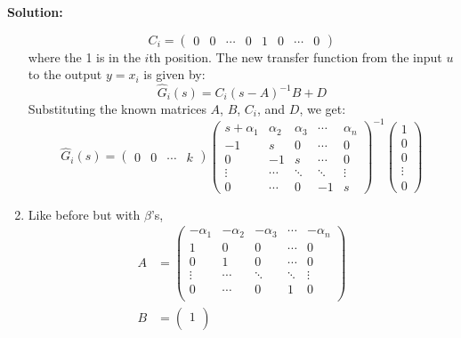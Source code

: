 \documentclass[12pt]{article}
\newenvironment{solution}{
    \textbf{Solution:}
    
}{
    
    \vspace{2em}
}
\begin{document}
\begin{solution}
\begin{enumerate}[label=(\alph*)]
        \[
            C_i = \begin{pmatrix}
                0 & 0 & \cdots & 0 & 1 & 0 & \cdots & 0
            \end{pmatrix}
        \]
        where the 1 is in the \(i\)th position. The new transfer function from the input \(u\) to the output \(y = x_i\) is given by:
        \[
            \hat{G}_i(s) = C_i(s - A)^{-1}B + D
        \]
        Substituting the known matrices \(A\), \(B\), \(C_i\), and \(D\), we get:
        \[
            \hat{G}_i(s) = \begin{pmatrix}
                0 & 0 & \cdots & k
            \end{pmatrix}
            \begin{pmatrix}
                s + \alpha_1 & \alpha_2 & \alpha_3 & \cdots & \alpha_n \\
                -1 & s & 0 & \cdots & 0 \\
                0 & -1 & s & \cdots & 0 \\
                \vdots & \cdots & \ddots & \ddots & \vdots \\
                0 & \cdots & 0 & -1 & s
            \end{pmatrix}^{-1}
            \begin{pmatrix}
                1 \\
                0 \\
                0 \\
                \vdots \\
                0
            \end{pmatrix}
        \]
        \item Like before but with \(\beta\)'s,
        \[
            \begin{aligned}
                A &= \begin{pmatrix}
                    -\alpha_1 & -\alpha_2 & -\alpha_3 & \cdots & -\alpha_n \\
                    1 & 0 & 0 & \cdots & 0 \\
                    0 & 1 & 0 & \cdots & 0 \\
                    \vdots & \cdots & \ddots & \ddots & \vdots \\
                    0 & \cdots & 0 & 1 & 0 \\
                \end{pmatrix}\\
                B &= \begin{pmatrix}
                    1 \\

\end{pmatrix}
\end{aligned}\]
\end{enumerate}
\end{solution}
\end{document}
